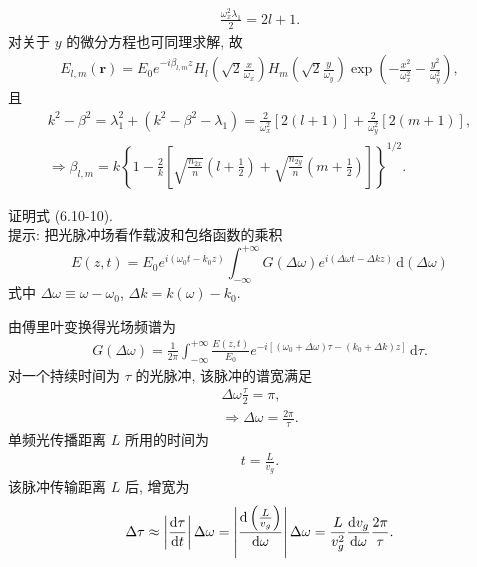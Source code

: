 \documentclass[twoside]{note}
\begin{document}
\begin{pf}
    \begin{align}
        \frac{\omega_x^2\lambda_1}{2}=2l+1.
    \end{align}
    对关于 $y$ 的微分方程也可同理求解, 故
    \begin{align}
        E_{l,m}(\bm{r})=E_0e^{-i\beta_{l,m}z}H_l\left(\sqrt{2}\frac{x}{\omega_x}\right)H_m\left(\sqrt{2}\frac{y}{\omega_y}\right)\exp\left(-\frac{x^2}{\omega_x^2}-\frac{y^2}{\omega_y^2}\right),
    \end{align}
    且
    \begin{gather}
        k^2-\beta^2=\lambda_1^2+(k^2-\beta^2-\lambda_1)=\frac{2}{\omega_x^2}[2(l+1)]+\frac{2}{\omega_y^2}[2(m+1)],\\
        \Longrightarrow\beta_{l,m}=k\left\{1-\frac{2}{k}\left[\sqrt{\frac{n_{2x}}{n}}\left(l+\frac{1}{2}\right)+\sqrt{\frac{n_{2y}}{n}}\left(m+\frac{1}{2}\right)\right]\right\}^{1/2}.
    \end{gather}
\end{pf}

\begin{exe}
    证明式 (6.10-10).\\
    提示: 把光脉冲场看作载波和包络函数的乘积
    \[
        E(z,t)=E_0e^{i(\omega_0t-k_0z)}\int_{-\infty}^{+\infty}G(\Delta\omega)e^{i(\Delta\omega t-\Delta kz)}\,\mathrm{d}(\Delta\omega)
    \]
    式中 $\Delta\omega\equiv\omega-\omega_0$, $\Delta k=k(\omega)-k_0$.
\end{exe}
\begin{pf}
    由傅里叶变换得光场频谱为
    \begin{align}
        G(\Delta\omega)=\frac{1}{2\pi}\int_{-\infty}^{+\infty}\frac{E(z,t)}{E_0}e^{-i[(\omega_0+\Delta\omega)\tau-(k_0+\Delta k)z]}\,\mathrm{d}\tau.
    \end{align}
    对一个持续时间为 $\tau$ 的光脉冲, 该脉冲的谱宽满足
    \begin{gather}
        \Delta\omega\frac{\tau}{2}=\pi,\\
        \Longrightarrow\Delta\omega=\frac{2\pi}{\tau}.
    \end{gather}
    单频光传播距离 $L$ 所用的时间为
    \begin{align}
        t=\frac{L}{v_g}.
    \end{align}
    该脉冲传输距离 $L$ 后, 增宽为
    \begin{align}
        \Delta\tau\approx\left\lvert\frac{\mathrm{d}\tau}{\mathrm{d}t}\right\rvert\Delta\omega=\left\lvert\frac{\mathrm{d}\left(\frac{L}{v_g}\right)}{\mathrm{d}\omega}\right\rvert\Delta\omega=\frac{L}{v_g^2}\frac{\mathrm{d}v_g}{\mathrm{d}\omega}\frac{2\pi}{\tau}.
    \end{align}
\end{pf}
\end{document}
